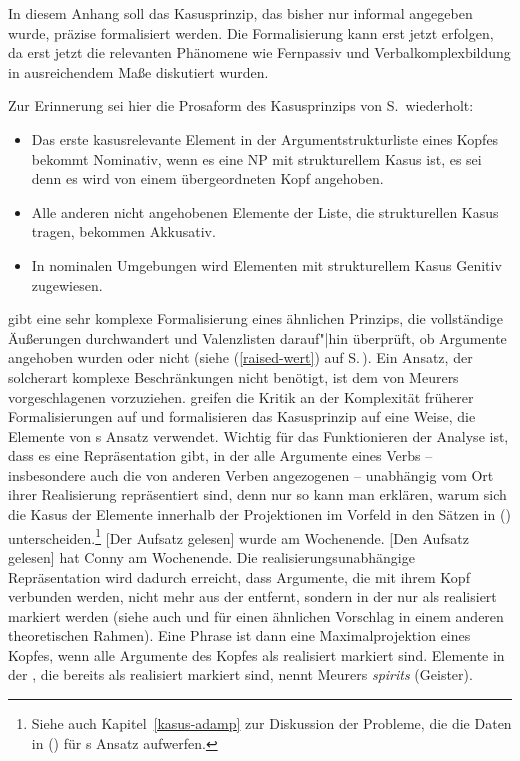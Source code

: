 {In diesem Anhang soll das Kasusprinzip, das bisher nur informal angegeben wurde,
präzise formalisiert werden. Die Formalisierung kann erst jetzt erfolgen, da erst jetzt die
relevanten Phänomene wie Fernpassiv und Verbalkomplexbildung in ausreichendem
Maße diskutiert wurden.

Zur Erinnerung sei hier die Prosaform des Kasusprinzips von S.\,\pageref{case-p} wiederholt:
\begin{prinzip-break}[Kasusprinzip]
\label{case-p-zwei}
\begin{itemize}
\item Das erste kasusrelevante Element in der Argumentstrukturliste eines Kopfes bekommt
  Nominativ, wenn es eine NP mit strukturellem Kasus ist, es sei denn es wird von einem übergeordneten Kopf angehoben. 
\item Alle anderen nicht angehobenen Elemente der Liste, die strukturellen Kasus tragen, bekommen Akkusativ.
\item In nominalen Umgebungen wird Elementen mit strukturellem Kasus Genitiv zugewiesen.
\end{itemize}
\end{prinzip-break}
\largerpage

\noindent
\textcites{Meurers99b}[Abschnitt~10.4.1.4]{Meurers2000b} gibt eine sehr komplexe Formalisierung eines ähnlichen Prinzips, die vollständige Äußerungen
durchwandert und Valenzlisten darauf"|hin überprüft, ob Argumente angehoben wurden oder nicht (siehe
(\ref{raised-wert}) auf S.\,\pageref{raised-wert}). Ein Ansatz, der solcherart komplexe Beschränkungen 
nicht benötigt, ist dem von Meurers vorgeschlagenen vorzuziehen. 
%
\citet[--57]{MdK2001a} greifen die Kritik an der Komplexität früherer Formalisierungen
auf und formalisieren das Kasusprinzip auf eine Weise, die Elemente von \prz{}s Ansatz \citeyearpar{Prze99}
verwendet. Wichtig für das Funktionieren der Analyse ist, dass es eine Repräsentation
gibt, in der alle Argumente eines Verbs -- insbesondere auch die von anderen Verben angezogenen -- unabhängig
vom Ort ihrer Realisierung repräsentiert sind, denn nur so kann man erklären,
warum sich die Kasus der Elemente innerhalb der Projektionen im Vorfeld in
den Sätzen in () unterscheiden.\footnote{
  Siehe auch Kapitel~\ref{kasus-adamp} zur Diskussion der Probleme, die die Daten in () für \prz{}s Ansatz aufwerfen.%
}
\eal
\label{bsp-der-aufsatz-gelesen-zwei}
\ex {}[Der Aufsatz gelesen] wurde am Wochenende.
\ex {}[Den Aufsatz gelesen] hat Conny am Wochenende.
\zl
Die realisierungsunabhängige Repräsentation wird dadurch erreicht, dass
Argumente, die mit ihrem Kopf verbunden werden, nicht mehr aus der \compsl entfernt,
sondern in der \compsl nur als realisiert markiert werden (siehe auch  und 
für einen ähnlichen Vorschlag in einem anderen theoretischen Rahmen). 
Eine Phrase ist dann eine Maximalprojektion eines Kopfes, wenn alle Argumente des Kopfes als realisiert markiert sind.
Elemente in der \compsl, die bereits als realisiert markiert sind, nennt Meurers \emph{spirits}
(Geister).

}
